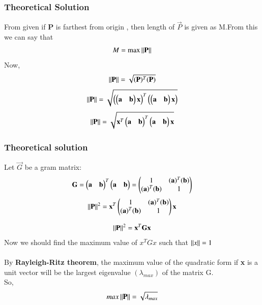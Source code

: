 \documentclass{beamer}
\begin{document}
\begin{frame}
\frametitle{Theoretical Solution}
From given if \textbf{P} is farthest from origin , then length of $\vec{P}$ is given as M.From this we can say  that
\begin{align}
   M=\text{max}\norm{\Vec{P}}
\end{align}
Now,
\begin{align}
    \norm{\Vec{P}}=\sqrt{(\Vec{P})^T(\Vec{P})}
\end{align}
\begin{align}
    \norm{\Vec{P}}=\sqrt{\brak{\myvec{\Vec{a}&\Vec{b}}\Vec{x}}^T\brak{\myvec{\Vec{a}&\Vec{b}}\Vec{x}}}
\end{align}
\begin{align}
    \norm{\Vec{P}}=\sqrt{\Vec{x}^T\myvec{\Vec{a}&\Vec{b}}^T\myvec{\Vec{a}&\Vec{b}}\Vec{x}}
\end{align}






\end{frame}
\begin{frame}
\frametitle{Theoretical solution}
Let $\Vec{G}$ be a gram matrix:
\begin{align}
    \Vec{G}=\myvec{\Vec{a}&\Vec{b}}^T\myvec{\Vec{a}&\Vec{b}}=\myvec{1&(\Vec{a})^T(\Vec{b})\\(\Vec{a})^T(\Vec{b})&1}
\end{align}
\begin{align}
       \norm{\Vec{P}}^2=\Vec{x}^T\myvec{1&(\Vec{a})^T(\Vec{b})\\(\Vec{a})^T(\Vec{b})&1}\Vec{x}
\end{align}

\begin{align}
\norm{\Vec{P}}^2=\Vec{x}^T\vec{G}\Vec{x}
  \end{align}
Now we should find the maximum value of \textbf{$x^TGx$} such that $\left\lVert x\right\rVert=1$\\\\
By \textbf{Rayleigh-Ritz theorem}, the maximum value of the quadratic form if \textbf{x} is a unit vector will be the largest eigenvalue $(\lambda_{max})$ of the matrix G.\\
So,
\begin{align}
    max\norm{\Vec{P}}=\sqrt{\lambda_{max}}
\end{align}


\end{frame}
\end{document}
